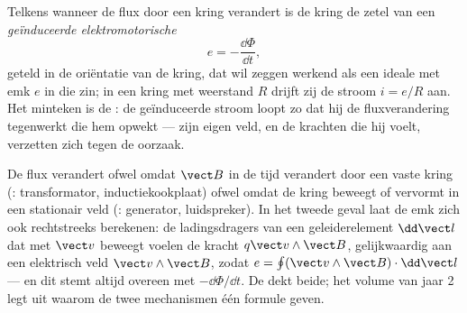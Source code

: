 \begin{theorem}\label{thm:b1:induction:faraday}
Telkens wanneer de flux door een kring verandert is de kring de zetel van
een \emph{geïnduceerde elektromotorische }
\[
e = -\frac{\dd\Phi}{\dd t} ,
\]
geteld in de oriëntatie van de kring, dat wil zeggen werkend als een ideale
 met emk $e$ in die zin; in een kring met weerstand $R$
drijft zij de stroom $i = e/R$ aan. Het minteken is de \emph{}:
de geïnduceerde stroom loopt zo dat hij de fluxverandering tegenwerkt die
hem opwekt --- zijn eigen veld, en de krachten die hij voelt, verzetten zich tegen de oorzaak.
\end{theorem}
\admitted

\begin{remark}\label{rem:b1:induction:twofaces}
De flux verandert ofwel omdat $\vect B$ in de tijd verandert door een
vaste kring (\emph{}: transformator, inductiekookplaat)
ofwel omdat de kring beweegt of vervormt in een stationair veld
(\emph{}: generator, luidspreker). In het tweede geval
laat de emk zich ook rechtstreeks berekenen: de ladingsdragers van een geleiderelement
$\dd\vect l$ dat met $\vect v$ beweegt voelen de kracht $q\vect v\wedge
\vect B$, gelijkwaardig aan een elektrisch veld $\vect v\wedge\vect B$, zodat
$e = \oint(\vect v\wedge\vect B)\cdot\dd\vect l$ --- en dit stemt altijd overeen
met $-\dd\Phi/\dd t$. De  dekt beide; het volume van jaar 2
legt uit waarom de twee mechanismen één formule geven.
\end{remark}

